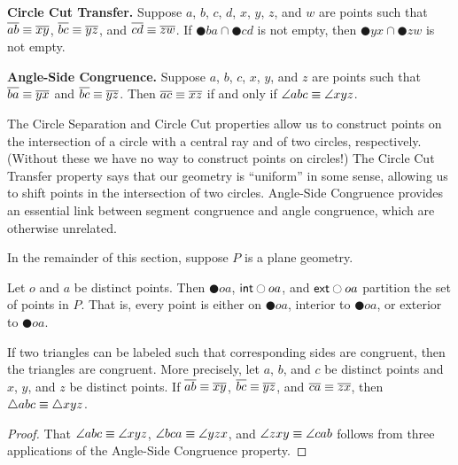 \begin{dfn}
\begin{proplist}
\item \textbf{Circle Cut Transfer.} Suppose \(a\), \(b\), \(c\), \(d\), \(x\), \(y\), \(z\), and \(w\) are points such that \(\overline{ab} \equiv \overline{xy}\), \(\overline{bc} \equiv \overline{yz}\), and \(\overline{cd} \equiv \overline{zw}\).
If \(\CIRCLE{b}{a} \cap \CIRCLE{c}{d}\) is not empty, then \(\CIRCLE{y}{x} \cap \CIRCLE{z}{w}\) is not empty.

\item \textbf{Angle-Side Congruence.} Suppose \(a\), \(b\), \(c\), \(x\), \(y\), and \(z\) are points such that \(\overline{ba} \equiv \overline{yx}\) and \(\overline{bc} \equiv \overline{yz}\).
Then \(\overline{ac} \equiv \overline{xz}\) if and only if \(\angle{abc} \equiv \angle{xyz}\).
\end{proplist}
\end{dfn}

The Circle Separation and Circle Cut properties allow us to construct points on the intersection of a circle with a central ray and of two circles, respectively.
(Without these we have no way to construct points on circles!)
The Circle Cut Transfer property says that our geometry is ``uniform'' in some sense, allowing us to shift points in the intersection of two circles.
Angle-Side Congruence provides an essential link between segment congruence and angle congruence, which are otherwise unrelated.


In the remainder of this section, suppose \(P\) is a plane geometry.

\begin{prop}
Let \(o\) and \(a\) be distinct points.
Then \(\CIRCLE{o}{a}\), \(\mathsf{int}\ocircle{oa}\), and \(\mathsf{ext}\ocircle{oa}\) partition the set of points in \(P\).
That is, every point is either on \(\CIRCLE{o}{a}\), interior to \(\CIRCLE{o}{a}\), or exterior to \(\CIRCLE{o}{a}\).
\end{prop}

\begin{prop}
If two triangles can be labeled such that corresponding sides are congruent, then the triangles are congruent.
More precisely, let \(a\), \(b\), and \(c\) be distinct points and \(x\), \(y\), and \(z\) be distinct points.
If \(\overline{ab} \equiv \overline{xy}\), \(\overline{bc} \equiv \overline{yz}\), and \(\overline{ca} \equiv \overline{zx}\), then \(\bigtriangleup{abc} \equiv \bigtriangleup{xyz}\).
\end{prop}

\begin{proof}
That \(\angle{abc} \equiv \angle{xyz}\), \(\angle{bca} \equiv \angle{yzx}\), and \(\angle{zxy} \equiv \angle{cab}\) follows from three applications of the Angle-Side Congruence property.
\end{proof}

